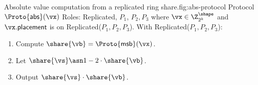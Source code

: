 \begin{Boxfig}{Absolute value computation from a replicated ring share.}{fig:abs-protocol}
  {Protocol $\Proto{\mathsf{abs}}(\vx)$}
  Roles: Replicated, $P_1$, $P_2, P_3$ where $\vx \in \Z_{2^k}^\shape$ and
  $\vx.\mathsf{placement}$ is on Replicated($P_1, P_2, P_3$). \newline
  With Replicated($P_1, P_2, P_3$):
  \begin{enumerate}
    \item Compute $\share{\vb} = \Proto{\mathsf{msb}}(\vx)$.
    \item Let $\share{\vs} \asn 1 - 2 \cdot \share{\vb}$.
    \item Output $\share{\vs} \cdot \share{\vb}$.
  \end{enumerate}

\end{Boxfig}

